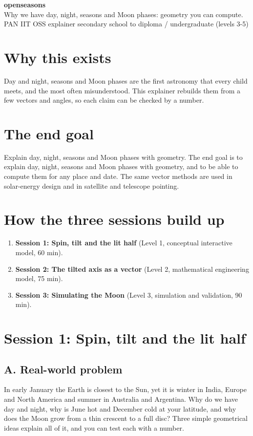 \documentclass[11pt,a4paper]{article}
\begin{document}
\begin{center}{\LARGE\bfseries openseasons}\\[0.4em]{\large Why we have day, night, seasons and Moon phases: geometry you can compute.}\\[0.2em]\small PAN IIT OSS explainer \textbullet{} secondary school to diploma / undergraduate (levels 3-5)\end{center}

\section*{Why this exists}
Day and night, seasons and Moon phases are the first astronomy that every child meets, and the most often misunderstood. This explainer rebuilds them from a few vectors and angles, so each claim can be checked by a number.

\section*{The end goal}
Explain day, night, seasons and Moon phases with geometry. The end goal is to explain day, night, seasons and Moon phases with geometry, and to be able to compute them for any place and date. The same vector methods are used in solar-energy design and in satellite and telescope pointing.

\section*{How the three sessions build up}
\begin{enumerate}[nosep]
\item \textbf{Session 1: Spin, tilt and the lit half} (Level 1, conceptual interactive model, 60 min).
\item \textbf{Session 2: The tilted axis as a vector} (Level 2, mathematical engineering model, 75 min).
\item \textbf{Session 3: Simulating the Moon} (Level 3, simulation and validation, 90 min).
\end{enumerate}

\section{Session 1: Spin, tilt and the lit half}

\subsection*{A. Real-world problem}
In early January the Earth is closest to the Sun, yet it is winter in India, Europe and North America and summer in Australia and Argentina. Why do we have day and night, why is June hot and December cold at your latitude, and why does the Moon grow from a thin crescent to a full disc? Three simple geometrical ideas explain all of it, and you can test each with a number.
\end{document}
